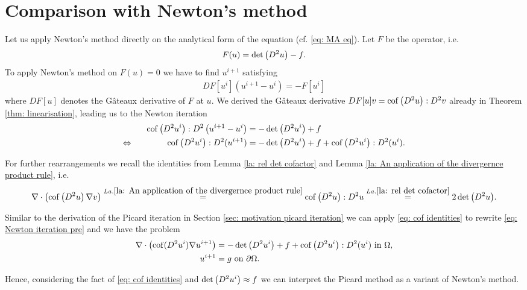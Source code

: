 \section{Comparison with Newton's method}

Let us apply Newton's method directly on the analytical form of the \MA equation (cf. \eqref{eq: MA eq}).
Let $F$ be the \MA operator, i.e. 
\[
	F(u) = \det{\left(D^2 u\right)} -f.
\]
To apply Newton's method on $F(u) =0$ we have to find $u^{i+1}$ satisfying
\begin{align}
	DF[u^i](u^{i+1}-u^i) = -F[u^i]
\end{align}
where $DF[u]$ denotes the G\^ateaux derivative of $F$ at $u$. We derived the G\^ateaux derivative $DF[u] v = \operatorname{cof} \left( D^2 u \right):D^2v$ already in Theorem \ref{thm: linearisation}, leading us to the Newton iteration
\begin{align}
	\operatorname{cof} \left( D^2 u^i \right):D^2\left(u^{i+1}-u^i\right) &= -\det{\left(D^2 u^i\right)}+f \nonumber \\
	\Leftrightarrow \qquad \qquad  \operatorname{cof} \left( D^2 u^i \right):D^2(u^{i+1}) &= -\det{\left(D^2 u^i\right)} +f  +\operatorname{cof} \left( D^2 u^i \right):D^2(u^i). \label{eq: Newton iteration pre}
\end{align}

For further rearrangements we recall the identities from Lemma \ref{la: rel det cofactor} and Lemma \ref{la: An application of the divergernce product rule}, i.e. 
\begin{align}
	\nabla \cdot \left( \operatorname{cof} \left( D^2 u  \right) \nabla v \right)
	\stackrel{La.\ref{la: An application of the divergernce product rule}}=\operatorname{cof} \left( D^2 u \right):D^2u
	\stackrel{La.\ref{la: rel det cofactor}}=2 \det{\left(D^2u\right)}. \label{eq: cof identities}
\end{align}

Similar to the derivation of the Picard iteration in Section \ref{sec: motivation picard iteration} we can apply \eqref{eq: cof identities} to rewrite \eqref{eq: Newton iteration pre} and we have the problem
\begin{align}
	\nabla \cdot \left( \operatorname{cof}(D^2 u^i) \nabla u^{i+1} \right) &= -\det{\left(D^2u^i\right)} +f+\operatorname{cof} \left( D^2 u^i \right):D^2(u^i)  \textnormal{ in } \Omega,  \label{eq: Newton iteration}\\
	u^{i+1} &= g \textnormal{ on } \partial \Omega .
\end{align}

Hence, considering the fact of \eqref{eq: cof identities} and $\det{\left(D^2 u^i\right)} \approx f$ we can interpret the Picard method as a variant of Newton's method. 

